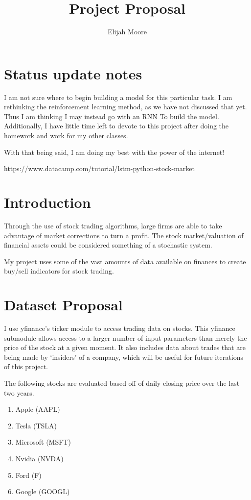 \documentclass{article}
\title{Project Proposal}
\author{Elijah Moore}
\begin{document}
\maketitle
\section{Status update notes}
    I am not sure where to begin building a model for this particular task. I am rethinking the reinforcement learning method, as we have not discussed that yet.
    Thus I am thinking I may instead go with an RNN To build the model. Additionally,
    I have little time left to devote to this project after doing the homework and work for my other classes.

    With that being said, I am doing my best with the power of the internet!

    https://www.datacamp.com/tutorial/lstm-python-stock-market

\section{Introduction}

   Through the use of stock trading algorithms, large firms are able to take advantage of market corrections
   to turn a profit. The stock market/valuation of financial assets could be considered something of a stochastic system.
   
   My project uses some of the vast amounts of data available on finances to
   create buy/sell indicators for stock trading.

\section{Dataset Proposal}
    I use yfinance's ticker module to access trading data on stocks.
    This yfinance submodule allows access to a larger number of input parameters than merely the price of the stock at a given moment.
    It also includes data about trades that are being made by `insiders' of a company, which will be useful for future iterations of this project.

    The following stocks are evaluated based off of daily closing price over the last two years.
    \begin{enumerate}
        \item Apple (AAPL)
        \item Tesla (TSLA)
        \item Microsoft (MSFT)
        \item Nvidia (NVDA)
        \item Ford (F)
        \item Google (GOOGL)
    \end{enumerate}
\end{document}
